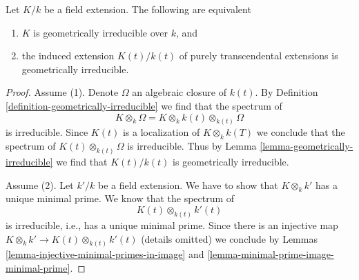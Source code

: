 \begin{lemma}
\label{lemma-geometrically-irreducible-base-change-transcendental}
Let $K/k$ be a field extension. The following are equivalent
\begin{enumerate}
\item $K$ is geometrically irreducible over $k$, and
\item the induced extension $K(t)/k(t)$ of purely transcendental extensions
is geometrically irreducible.
\end{enumerate}
\end{lemma}

\begin{proof}
Assume (1). Denote $\Omega$ an algebraic closure of $k(t)$.
By Definition \ref{definition-geometrically-irreducible}
we find that the spectrum of
$$
K \otimes_k \Omega = K \otimes_k k(t) \otimes_{k(t)} \Omega
$$
is irreducible. Since $K(t)$ is a localization of $K \otimes_k k(T)$
we conclude that the spectrum of $K(t) \otimes_{k(t)} \Omega$
is irreducible. Thus by Lemma \ref{lemma-geometrically-irreducible}
we find that $K(t)/k(t)$ is geometrically irreducible.

\medskip\noindent
Assume (2). Let $k'/k$ be a field extension.
We have to show that $K \otimes_k k'$ has a unique minimal prime.
We know that the spectrum of
$$
K(t) \otimes_{k(t)} k'(t)
$$
is irreducible, i.e., has a unique minimal prime.
Since there is an injective map
$K \otimes_k k' \to K(t) \otimes_{k(t)} k'(t)$ (details omitted)
we conclude by
Lemmas \ref{lemma-injective-minimal-primes-in-image} and
\ref{lemma-minimal-prime-image-minimal-prime}.
\end{proof}